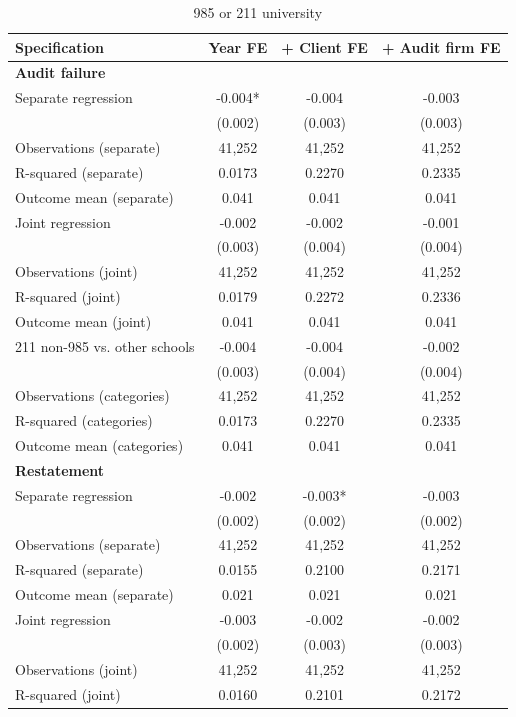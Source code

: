 \begin{table}[htbp]
\footnotesize
\centering
\caption{985 or 211 university}
\begin{threeparttable}
\begin{tabular}{p{}ccc}
\toprule
Specification & Year FE & + Client FE & + Audit firm FE \\
\midrule
\multicolumn{4}{l}{\textbf{Audit failure}} \\
Separate regression & -0.004* & -0.004 & -0.003 \\
 & (0.002) & (0.003) & (0.003) \\
Observations (separate) & 41,252 & 41,252 & 41,252 \\
R-squared (separate) & 0.0173 & 0.2270 & 0.2335 \\
Outcome mean (separate) & 0.041 & 0.041 & 0.041 \\
Joint regression & -0.002 & -0.002 & -0.001 \\
 & (0.003) & (0.004) & (0.004) \\
Observations (joint) & 41,252 & 41,252 & 41,252 \\
R-squared (joint) & 0.0179 & 0.2272 & 0.2336 \\
Outcome mean (joint) & 0.041 & 0.041 & 0.041 \\
211 non-985 vs. other schools & -0.004 & -0.004 & -0.002 \\
 & (0.003) & (0.004) & (0.004) \\
Observations (categories) & 41,252 & 41,252 & 41,252 \\
R-squared (categories) & 0.0173 & 0.2270 & 0.2335 \\
Outcome mean (categories) & 0.041 & 0.041 & 0.041 \\
\multicolumn{4}{l}{\textbf{Restatement}} \\
Separate regression & -0.002 & -0.003* & -0.003 \\
 & (0.002) & (0.002) & (0.002) \\
Observations (separate) & 41,252 & 41,252 & 41,252 \\
R-squared (separate) & 0.0155 & 0.2100 & 0.2171 \\
Outcome mean (separate) & 0.021 & 0.021 & 0.021 \\
Joint regression & -0.003 & -0.002 & -0.002 \\
 & (0.002) & (0.003) & (0.003) \\
Observations (joint) & 41,252 & 41,252 & 41,252 \\
R-squared (joint) & 0.0160 & 0.2101 & 0.2172 \\

\end{tabular}
\end{threeparttable}
\end{table}
